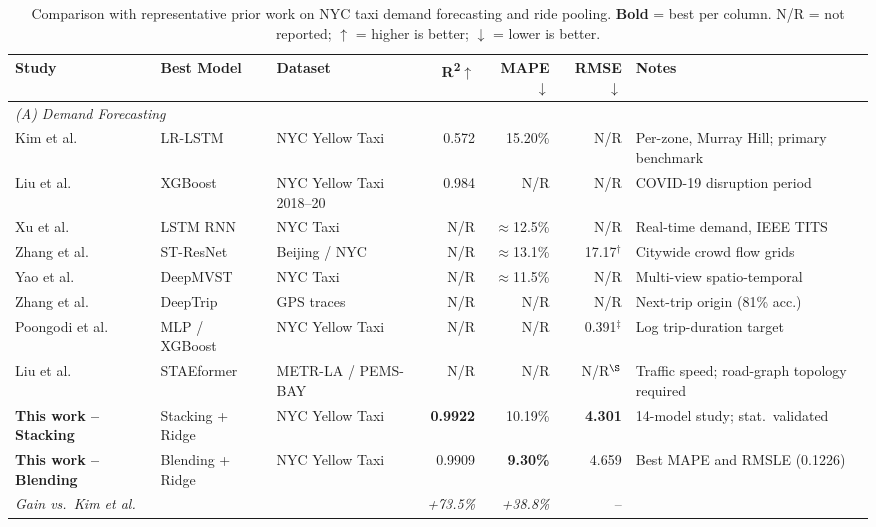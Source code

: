 \documentclass[a4paper,fleqn]{cas-dc}
\begin{document}
\begin{table}[t]
\centering
\caption{Comparison with representative prior work on NYC taxi demand forecasting and ride pooling.
  \textbf{Bold} = best per column.
  N/R = not reported; $\uparrow$ = higher is better; $\downarrow$ = lower is better.
  \label{tab:sota}}
\begin{threeparttable}
\small
\begin{tabular}{@{}p{2.6cm}p{2.0cm}p{2.2cm}rrrp{2.8cm}@{}}
\toprule
\textbf{Study} & \textbf{Best Model} & \textbf{Dataset} &
  \textbf{R\textsuperscript{2}$\uparrow$} & \textbf{MAPE$\downarrow$} &
  \textbf{RMSE$\downarrow$} & \textbf{Notes} \\
\midrule
\multicolumn{7}{l}{\textit{(A) Demand Forecasting}} \\[2pt]
Kim et al.~\cite{kim2020hybrid} & LR-LSTM & NYC Yellow Taxi & 0.572 & 15.20\% & N/R & Per-zone, Murray Hill; primary benchmark \\
Liu et al.~\cite{liu2021epidemic} & XGBoost & NYC Yellow Taxi 2018--20 & 0.984 & N/R & N/R & COVID-19 disruption period \\
Xu et al.~\cite{xu2017realtime} & LSTM RNN & NYC Taxi & N/R & $\approx$12.5\% & N/R & Real-time demand, IEEE TITS \\
Zhang et al.~\cite{zhang2017deep} & ST-ResNet & Beijing / NYC & N/R & $\approx$13.1\% & 17.17$^{\dagger}$ & Citywide crowd flow grids \\
Yao et al.~\cite{yao2018deeptraffic} & DeepMVST & NYC Taxi & N/R & $\approx$11.5\% & N/R & Multi-view spatio-temporal \\
Zhang et al.~\cite{zhang2023deeptrip} & DeepTrip & GPS traces & N/R & N/R & N/R & Next-trip origin (81\% acc.) \\
Poongodi et al.~\cite{poongodi2022nyc} & MLP / XGBoost & NYC Yellow Taxi & N/R & N/R & 0.391$^{\ddagger}$ & Log trip-duration target \\
Liu et al.~\cite{liu2023staeformer} & STAEformer & METR-LA / PEMS-BAY & N/R & N/R & N/R$^{\S}$ & Traffic speed; road-graph topology required \\
\textbf{This work -- Stacking} & Stacking + Ridge & NYC Yellow Taxi & \textbf{0.9922} & 10.19\% & \textbf{4.301} & 14-model study; stat.\ validated \\
\textbf{This work -- Blending} & Blending + Ridge & NYC Yellow Taxi & 0.9909 & \textbf{9.30\%} & 4.659 & Best MAPE and RMSLE (0.1226) \\
\textit{Gain vs.~Kim et al.} & & & \textit{+73.5\%} & \textit{+38.8\%} & -- & \\

\end{tabular}
\end{threeparttable}
\end{table}
\end{document}

